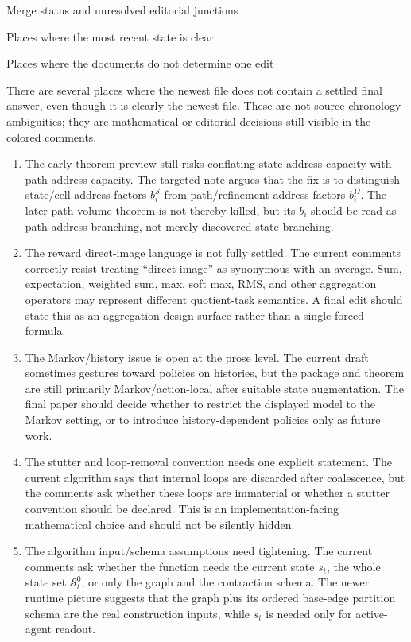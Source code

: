 \documentclass[11pt]{article}
\begin{document}
\begin{section}{Merge status and unresolved editorial junctions}
\begin{subsection}{Places where the most recent state is clear}
\end{subsection}

\begin{subsection}{Places where the documents do not determine one edit}

There are several places where the newest file does not contain a settled
final answer, even though it is clearly the newest file.  These are not source
chronology ambiguities; they are mathematical or editorial decisions still
visible in the colored comments.

\begin{enumerate}
\item The early theorem preview still risks conflating state-address capacity
with path-address capacity.  The targeted note
argues that the fix is to distinguish state/cell address factors
$b_i^{\mathcal S}$ from path/refinement address factors $b_i^\Omega$.  The
later path-volume theorem is not thereby killed, but its $b_i$ should be read
as path-address branching, not merely discovered-state branching.

\item The reward direct-image language is not fully settled.  The current
comments correctly resist treating ``direct image'' as synonymous with an
average.  Sum, expectation, weighted sum, max, soft max, RMS, and other
aggregation operators may represent different quotient-task semantics.  A
final edit should state this as an aggregation-design surface rather than a
single forced formula.

\item The Markov/history issue is open at the prose level.  The current draft
sometimes gestures toward policies on histories, but the package and theorem
are still primarily Markov/action-local after suitable state augmentation.
The final paper should decide whether to restrict the displayed model to the
Markov setting, or to introduce history-dependent policies only as future
work.

\item The stutter and loop-removal convention needs one explicit statement.
The current algorithm says that internal loops are discarded after coalescence,
but the comments ask whether these loops are immaterial or whether a stutter
convention should be declared.  This is an implementation-facing mathematical
choice and should not be silently hidden.

\item The algorithm input/schema assumptions need tightening.  The current
comments ask whether the function needs the current state $s_t$, the whole
state set $\mathcal S_t^0$, or only the graph and the contraction schema.  The
newer runtime picture suggests that the graph plus its ordered base-edge
partition schema are the real construction inputs, while $s_t$ is needed only
for active-agent readout.


\end{enumerate}
\end{subsection}
\end{section}
\end{document}
